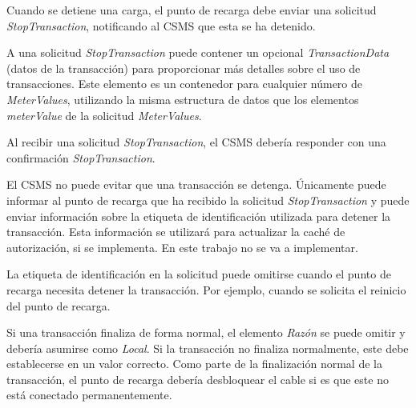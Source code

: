 \documentclass[12pt,a4paper,onecolumn,oneside]{report}
\begin{document}
Cuando se detiene una carga, el punto de recarga debe enviar una solicitud \textit{StopTransaction}, notificando al CSMS que esta se ha detenido.

A una solicitud \textit{StopTransaction} puede contener un opcional \textit{TransactionData} (datos de la transacción) para proporcionar más detalles sobre el uso de transacciones. Este elemento es un contenedor para cualquier número de \textit{MeterValues}, utilizando la misma estructura de datos que los elementos \textit{meterValue} de la solicitud \textit{MeterValues}.

Al recibir una solicitud \textit{StopTransaction}, el CSMS debería responder con una confirmación \textit{StopTransaction}.

El CSMS no puede evitar que una transacción se detenga. Únicamente puede informar al punto de recarga que ha recibido la solicitud \textit{StopTransaction} y puede enviar información sobre la etiqueta de identificación utilizada para detener la transacción. Esta información se utilizará para actualizar la caché de autorización, si se implementa. En este trabajo no se va a implementar.

La etiqueta de identificación en la solicitud puede omitirse cuando el punto de recarga necesita detener la transacción. Por ejemplo, cuando se solicita el reinicio del punto de recarga.

Si una transacción finaliza de forma normal, el elemento \textit{Razón} se puede omitir y debería asumirse como \textit{Local}. Si la transacción no finaliza normalmente, este debe establecerse en un valor correcto. Como parte de la finalización normal de la transacción, el punto de recarga debería desbloquear el cable si es que este no está conectado permanentemente.
\end{document}
